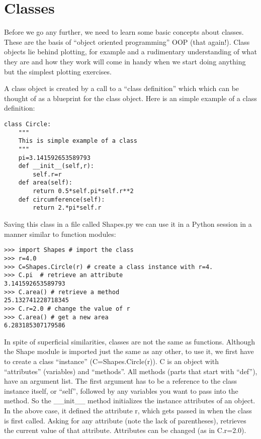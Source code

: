 {\section{Classes}

Before we go any further, we need to learn some basic concepts about classes. These 
 are the basis of  ``object oriented programming'' OOP (that again!).   Class objects lie behind plotting, for example and a rudimentary understanding of what they are and how they work will come in handy when we start doing anything but the simplest plotting exercises.  
 
  A class object is   created by a call  to a ``class definition''  which which can be thought of as a blueprint for the class object.  Here is an simple example of a class definition:

{\singlespacing \color{blue} \begin{verbatim}
class Circle:
    """
    This is simple example of a class
    """
    pi=3.141592653589793
    def __init__(self,r):
        self.r=r
    def area(self):
        return 0.5*self.pi*self.r**2
    def circumference(self):
        return 2.*pi*self.r

\end{verbatim}}

\noindent Saving this class in a file called {\color{blue}Shapes.py} we can use it in a Python session in a manner similar to function modules:

{\singlespacing \color{blue} \begin{verbatim}
>>> import Shapes # import the class
>>> r=4.0
>>> C=Shapes.Circle(r) # create a class instance with r=4.
>>> C.pi  # retrieve an attribute
3.141592653589793
>>> C.area() # retrieve a method
25.132741228718345
>>> C.r=2.0 # change the value of r
>>> C.area() # get a new area
6.283185307179586
\end{verbatim}}

\noindent In spite of superficial similarities, classes are not the same as functions.  Although the Shape module is imported just the same as any other, to use it, we first have to create a class ``instance'' ({\color{blue}C=Shapes.Circle(r)}).  {\color{blue}C} is an object with 	``attributes'' (variables) and ``methods''.  
All methods (parts that start with ``def''),  have an argument list. The first argument has to be a reference to the class instance itself, or ``self'', followed by any variables you want to pass into the method.  So the {\color{blue}\_\_init\_\_} method initializes the instance attributes of an object.  In the above case, it defined the attribute {\color{blue}r}, which gets passed in when the class is first called.  
Asking for any attribute (note the lack of parentheses), retrieves the current value of that attribute.  Attributes can be changed (as in  {\color{blue}C.r=2.0}).   

}
